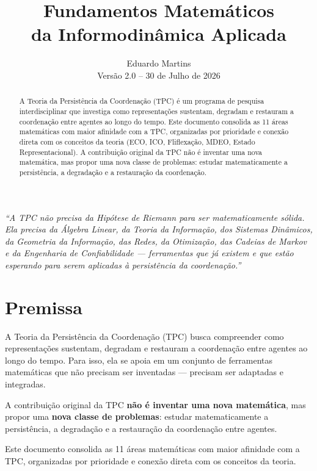 \documentclass[12pt,a4paper]{article}
\title{\LARGE\textbf{Fundamentos Matemáticos}\\%
       \large da Informodinâmica Aplicada}
\author{Eduardo Martins\\%
        \small Versão 2.0 -- 30 de Julho de 2026}
\date{}
\begin{document}
\maketitle
\thispagestyle{empty}

\begin{center}
\textit{``A TPC não precisa da Hipótese de Riemann para ser matematicamente sólida. Ela precisa da Álgebra Linear, da Teoria da Informação, dos Sistemas Dinâmicos, da Geometria da Informação, das Redes, da Otimização, das Cadeias de Markov e da Engenharia de Confiabilidade — ferramentas que já existem e que estão esperando para serem aplicadas à persistência da coordenação.''}
\end{center}

\vspace{1cm}

\begin{abstract}
A Teoria da Persistência da Coordenação (TPC) é um programa de pesquisa interdisciplinar que investiga como representações sustentam, degradam e restauram a coordenação entre agentes ao longo do tempo. Este documento consolida as 11 áreas matemáticas com maior afinidade com a TPC, organizadas por prioridade e conexão direta com os conceitos da teoria (ECO, ICO, Fliflexação, MDEO, Estado Representacional). A contribuição original da TPC não é inventar uma nova matemática, mas propor uma nova classe de problemas: estudar matematicamente a persistência, a degradação e a restauração da coordenação.
\end{abstract}

\newpage
\tableofcontents
\newpage

\section{Premissa}

A Teoria da Persistência da Coordenação (TPC) busca compreender como representações sustentam, degradam e restauram a coordenação entre agentes ao longo do tempo. Para isso, ela se apoia em um conjunto de ferramentas matemáticas que não precisam ser inventadas — precisam ser adaptadas e integradas.

A contribuição original da TPC \textbf{não é inventar uma nova matemática}, mas propor uma \textbf{nova classe de problemas}: estudar matematicamente a persistência, a degradação e a restauração da coordenação entre agentes.

Este documento consolida as 11 áreas matemáticas com maior afinidade com a TPC, organizadas por prioridade e conexão direta com os conceitos da teoria.
\end{document}
